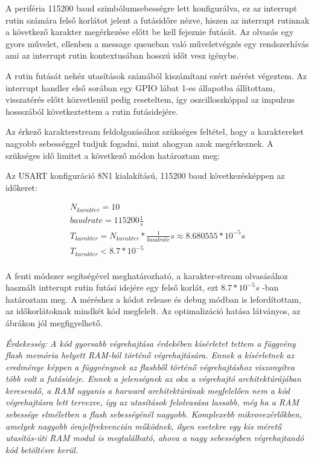 A periféria 115200 baud szimbólumsebességre lett konfigurálva, ez az interrupt
rutin számára felső korlátot jelent a futásidőre nézve, hiszen az interrupt
rutinnak a következő karakter megérkezése előtt be kell fejeznie futását. Az
olvasás egy gyors művelet, ellenben a message queueban való műveletvégzés egy
rendszerhívás ami az interrupt rutin kontextusában hosszú időt vesz igénybe.

A rutin futását nehéz utasítások számából kiszámítani ezért mérést végeztem. Az
interrupt handler első sorában egy GPIO lábat 1-es állapotba állítottam,
visszatérés előtt közvetlenül pedig reseteltem, így oszcilloszkóppal az impulzus
hossszából következtettem a rutin futásidejére.


Az érkező karakterstream feldolgozásához szükséges feltétel, hogy a karaktereket
nagyobb sebességgel tudjuk fogadni, mint ahogyan azok megérkeznek. A szükséges
idő limitet a következő módon határoztam meg:

\medskip

Az USART konfiguráció 8N1 kialakítású, 115200 baud következésképpen az időkeret:

\begin{eqnarray*}
N_{karakter} = 10 \\
baudrate = 115200 \frac{1}{s} \\
T_{karakter} = N_{karakter} * \frac{1}{baudrate} s \approx 8.680555 * 10^{-5} s \\
T_{karakter} < 8.7 * 10^{-5} \\
\end{eqnarray*}

A fenti módszer segítségével meghatározható, a karakter-stream olvasásához
használt intterupt rutin futási idejére egy felső korlát, ezt $8.7 * 10^{-5}s$
-ban határoztam meg. A méréshez a kódot release és debug módban is lefordítottam,
az időkorlátoknak mindkét kód megfelelt. Az optimalizáció hatása látványos, az
ábrákon jól megfigyelhető.

\medskip
\textsl{
Érdekesség: A kód gyorsabb végrehajtása érdekében kísérletet tettem a függvény
flash memória helyett RAM-ból történő végrehajtására. Ennek a kísérletnek az
eredménye képpen a függvénynek az flashből történő végrehajtáshoz viszonyítva
több volt a futásideje. Ennek a jelenségnek az oka a végrehajtó architektúrájában
keresendő, a RAM ugyanis a harward architektúrának megfelelően nem a
kód végrehajtásra lett tervezve, így az utasítások felolvasása lassabb, még ha a
RAM sebessége elméletben a flash sebességénél nagyobb. Komplexebb
mikrovezérlőkben, amelyek nagyobb órajelfrekvencián működnek, ilyen esetekre egy
kis méretű utasítás-úti RAM modul is megtalálható, ahova a nagy sebességben
végrehajtandó kód betöltésre kerül.
}


